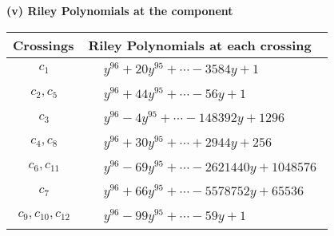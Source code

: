 \documentclass[1p]{elsarticle_modified}
\theoremstyle{definition}
\begin{document}
\flushleft \textbf{(v) Riley Polynomials at the component}\newline \\
\begin{tabular}{m{50pt}|m{274pt}}
Crossings & \hspace{64pt}Riley Polynomials at each crossing \\
\hline $$\begin{aligned}c_{1}\end{aligned}$$&$\begin{aligned}
&y^{96}+20 y^{95}+\cdots-3584 y+1
\end{aligned}$\\
\hline $$\begin{aligned}c_{2},c_{5}\end{aligned}$$&$\begin{aligned}
&y^{96}+44 y^{95}+\cdots-56 y+1
\end{aligned}$\\
\hline $$\begin{aligned}c_{3}\end{aligned}$$&$\begin{aligned}
&y^{96}-4 y^{95}+\cdots-148392 y+1296
\end{aligned}$\\
\hline $$\begin{aligned}c_{4},c_{8}\end{aligned}$$&$\begin{aligned}
&y^{96}+30 y^{95}+\cdots+2944 y+256
\end{aligned}$\\
\hline $$\begin{aligned}c_{6},c_{11}\end{aligned}$$&$\begin{aligned}
&y^{96}-69 y^{95}+\cdots-2621440 y+1048576
\end{aligned}$\\
\hline $$\begin{aligned}c_{7}\end{aligned}$$&$\begin{aligned}
&y^{96}+66 y^{95}+\cdots-5578752 y+65536
\end{aligned}$\\
\hline $$\begin{aligned}c_{9},c_{10},c_{12}\end{aligned}$$&$\begin{aligned}
&y^{96}-99 y^{95}+\cdots-59 y+1
\end{aligned}$\\
\hline
\end{tabular}\\~\\
\end{document}
